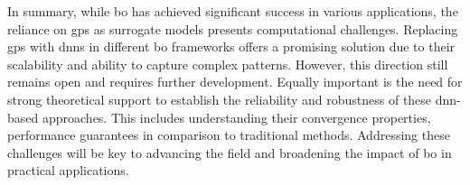 In summary, while \ac{bo} has achieved significant success in various applications, the reliance on \aclp{gp} as surrogate models presents computational challenges. Replacing \acp{gp} with \acp{dnn} in different \ac{bo} frameworks offers a promising solution due to their scalability and ability to capture complex patterns. However, this direction still remains open and requires further development. Equally important is the need for strong theoretical support to establish the reliability and robustness of these \ac{dnn}-based approaches. This includes understanding their convergence properties, performance guarantees in comparison to traditional methods. Addressing these challenges will be key to advancing the field and broadening the impact  of \ac{bo} in practical applications. 


